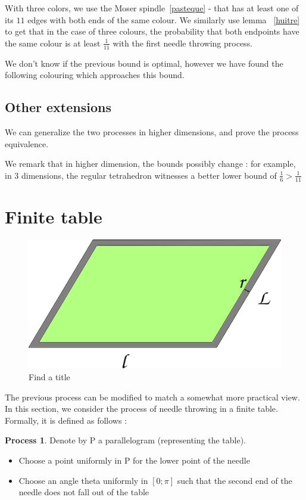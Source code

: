 \documentclass[a4paper,11pt]{article}
\theoremstyle{definition}
\newtheorem{process}{Process}
\theoremstyle{remark}
\begin{document}
 With three colors, we use the Moser spindle~\ref{pasteque} - that has at least one of its $11$ edges with both ends of the same colour.
 We similarly use lemma ~\ref{huitre} to get that in the case of three colours,
 the probability that both endpoints have the same colour is at least $\frac{1}{11}$ with the first needle throwing process. 

We don't know if the previous bound is optimal, however we have found the
following colouring which approaches this bound.
  

\subsection{Other extensions}
\label{dim}
We can generalize the two processes in higher dimensions, and prove the
process equivalence. %

We remark that in higher dimension, the bounds possibly change : for
example, in 3 dimensions, the regular tetrahedron witnesses a better lower bound
of $\frac 1 6 >\frac 1 {11}$   

\section{Finite table}

\begin{figure}[h]
\center
\includegraphics[scale=0.5]{tablefinie.png}
\caption{\label{tablefinie} Find a title}
\end{figure}
The previous process can be modified to match a somewhat more practical view. In this section, we consider the process of needle throwing in a finite table. 
Formally, it is defined as follows :
\begin{process}
Denote by P a parallelogram (representing the table). 
\begin{itemize}
\item Choose a point uniformly in P for the lower point of the needle
\item Choose an angle theta uniformly in $[0 ; \pi]$ such that the second end of the needle does not fall out of the table
\end{itemize}
\end{process}
\end{document}
